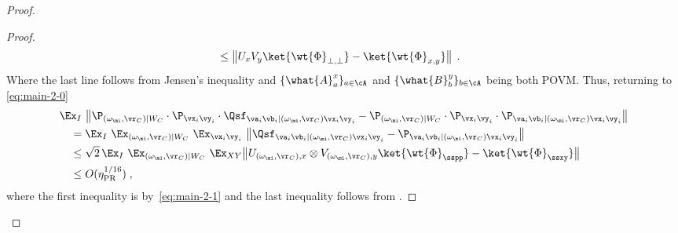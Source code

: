 \begin{proof}
\begin{proof}
\begin{align}
			&\leq \big\| U_{x}  V_{y} \ket{\wt{\Phi}_{\bot,\bot}} - \ket{\wt{\Phi}_{x,y}} \big\| 	\noindent \,\;.\label{eq:main-2-1}
		\end{align}
		Where the last line follows from Jensen's inequality and  $\{	\what{A}^{x}_a \}_{a \in \cA}$ and $\{	\what{B}^{y}_b \}_{b \in \cA}$ being both POVM. Thus, returning to \eqref{eq:main-2-0}
		\begin{align*}
			&\Ex_I \,\, \big\| \P_{(\omega_{\mi}, \vr_C) |W_C} \cdot \P_{\vx_i \vy_i} \cdot \Qsf_{\va_i \vb_i |(\omega_{\mi}, \vr_C) \vx_i \vy_i } 
			-  \P_{(\omega_{\mi}, \vr_C) |W_C} \cdot \P_{\vx_i \vy_i} \cdot \P_{\va_i \vb_i | (\omega_{\mi}, \vr_C) \vx_i \vy_i} \big \|  \\
			&\quad = \Ex_I \, \, \Ex_{(\omega_{\mi}, \vr_C) |W_C} \,\, \Ex_{\vx_i \vy_i} \,\, \big \| \Qsf_{\va_i \vb_i |(\omega_{\mi}, \vr_C) \vx_i \vy_i} - \P_{\va_i \vb_i | (\omega_{\mi}, \vr_C) \vx_i \vy_i} \big \|    \\
			&\quad \leq \sqrt{2} \, \Ex_I \, \, \Ex_{(\omega_{\mi}, \vr_C) |W_C} \,\, \Ex_{XY} \big\| U_{(\omega_{\mi}, \vr_C),x} \otimes V_{(\omega_{\mi}, \vr_C),y} \ket{\wt{\Phi}_\sspp} - \ket{\wt{\Phi}_{\ssxy}} \big\|\\
			&\quad \leq O(\eta_{\text{PR}}^{1/16})\;,
		\end{align*}
		where the first inequality is by~\eqref{eq:main-2-1} and the last inequality follows from .
	\end{proof}
	
	

\end{proof}
